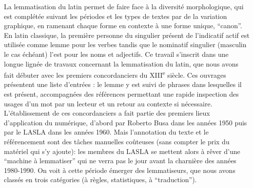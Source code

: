 La lemmatisation du latin permet de faire face à la diversité morphologique, qui est complétée suivant les périodes et les types de textes par de la variation graphique, en ramenant chaque forme en contexte à une forme unique, \enquote{canon}. En latin classique, la première personne du singulier présent de l'indicatif actif est utilisée comme lemme pour les verbes tandis que le nominatif singulier (masculin le cas échéant) l'est pour les noms et adjectifs. Ce travail s'inscrit dans une longue lignée de travaux concernant la lemmatisation du latin, que nous avons fait débuter avec les premiers concordanciers du XIII\textsuperscript{e} siècle. Ces ouvrages présentent une liste d'entrées : le lemme y est suivi de phrases dans lesquelles il est présent, accompagnées des références permettant une rapide inspection des usages d'un mot par un lecteur et un retour au contexte si nécessaire. L'établissement de ces concordanciers a fait partie des premiers lieux d'application du numérique, d'abord par Roberto Busa dans les années 1950 puis par le LASLA dans les années 1960. Mais l'annotation du texte et le référencement sont des tâches manuelles coûteuses (sans compter le prix du matériel qui s'y ajoute): les membres du LASLA se mettent alors à rêver d'une \enquote{machine à lemmatiser} qui ne verra pas le jour avant la charnière des années 1980-1990. On voit à cette période émerger des lemmatiseurs, que nous avons classés en trois catégories (à règles, statistiques, à \enquote{traduction}). 

